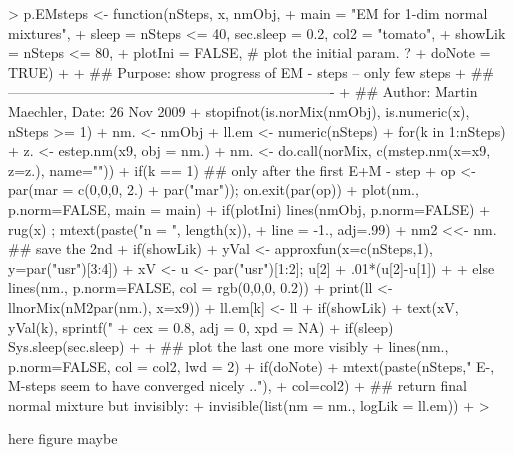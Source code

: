 \begin{Schunk}
\begin{Sinput}
> p.EMsteps <- function(nSteps, x, nmObj,
+                       main = "EM for 1-dim normal mixtures",
+                       sleep = nSteps <= 40, sec.sleep = 0.2, col2 = "tomato",
+                       showLik = nSteps <= 80,
+                       plotIni = FALSE, # plot the initial param. ?
+                       doNote = TRUE)
+ {
+     ## Purpose: show progress of EM - steps -- only few steps
+     ## ----------------------------------------------------------------------
+     ## Author: Martin Maechler, Date: 26 Nov 2009
+     stopifnot(is.norMix(nmObj), is.numeric(x), nSteps >= 1)
+     nm. <- nmObj
+     ll.em <- numeric(nSteps)
+     for(k in 1:nSteps) {
+         z. <- estep.nm(x9, obj = nm.)
+         nm. <- do.call(norMix, c(mstep.nm(x=x9, z=z.), name=""))
+         if(k == 1) { ## only after the first E+M - step
+             op <- par(mar = c(0,0,0, 2.) + par("mar")); on.exit(par(op))
+             plot(nm., p.norm=FALSE, main = main)
+             if(plotIni) lines(nmObj, p.norm=FALSE)
+             rug(x) ; mtext(paste("n = ", length(x)),
+                            line = -1., adj=.99)
+             nm2 <<- nm. ## save the 2nd
+             if(showLik) {
+                 yVal <- approxfun(x=c(nSteps,1), y=par("usr")[3:4])
+                 xV <- { u <- par("usr")[1:2]; u[2] + .01*(u[2]-u[1]) }
+             }
+         } else lines(nm., p.norm=FALSE, col = rgb(0,0,0, 0.2))
+         print(ll <- llnorMix(nM2par(nm.), x=x9))
+         ll.em[k] <- ll
+         if(showLik)
+             text(xV, yVal(k), sprintf("%
+                  cex = 0.8, adj = 0, xpd = NA)
+         if(sleep) Sys.sleep(sec.sleep)
+     }
+     ## plot the last one more visibly
+     lines(nm., p.norm=FALSE, col = col2, lwd = 2)
+     if(doNote)
+         mtext(paste(nSteps," E-, M-steps seem to have converged nicely .."),
+               col=col2)
+     ## return final normal mixture {but invisibly}:
+     invisible(list(nm = nm., logLik = ll.em))
+ }
> 
\end{Sinput}
\end{Schunk}

here figure maybe

